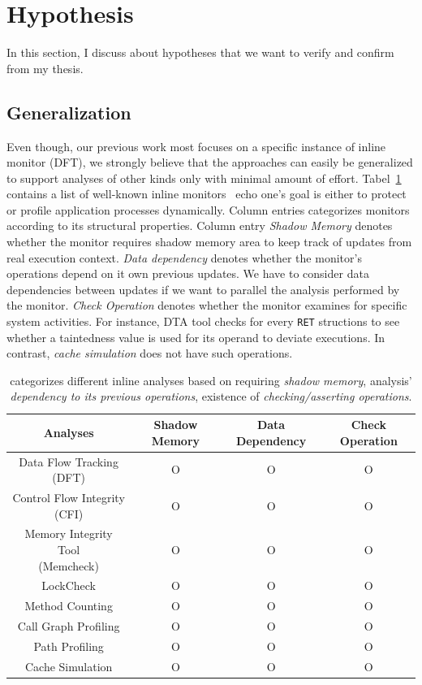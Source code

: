 \section{Hypothesis} \label{sec:hypo} 

In this section, I discuss about hypotheses that we want to verify and confirm
from my thesis.

\subsection{\sreplica Generalization}

Even though, our previous work most focuses on a specific instance of inline
monitor (\ie DFT), we strongly believe that the approaches can easily be
generalized to support analyses of other kinds only with minimal amount of
effort.  Tabel~\ref{tab:analyses} contains a list of well-known inline
monitors~\cite{CAB} echo one's goal is either to protect or profile application
processes dynamically. Column entries categorizes monitors according to its
structural properties. Column entry {\it Shadow Memory} denotes whether the
monitor requires shadow memory area to keep track of updates from real
execution context. {\it Data dependency} denotes whether the monitor's
operations depend on it own previous updates. We have to consider data
dependencies between updates if we want to parallel the analysis performed by
the monitor. {\it Check Operation} denotes whether the monitor examines for
specific system activities. For instance, DTA tool checks for every {\tt RET}
structions to see whether a taintedness value is used for its operand to
deviate executions. In contrast, {\it cache simulation} does not have such
operations.

\begin{table}[h]
    \centering
\begin{tabular}{|c|c|c|c|}
\hline
Analyses & Shadow Memory & Data Dependency & Check Operation \\ 
\hline \hline
Data Flow Tracking (DFT) & O & O & O \\ \hline
Control Flow Integrity (CFI) & O & O & O \\ \hline
\specialcell{Memory Integrity Tool \\ (Memcheck)} & O & O & O \\ \hline
LockCheck & O & O & O \\ \hline
Method Counting & O & O & O \\ \hline
Call Graph Profiling & O & O & O \\ \hline
Path Profiling & O & O & O \\ \hline
Cache Simulation & O & O & O \\ \hline
\end{tabular}
\caption{ categorizes different inline analyses based on requiring {\it shadow
memory}, analysis' {\it dependency to its previous operations}, existence of
{\it checking/asserting operations}. \label{tab:analyses}}
\end{table}

